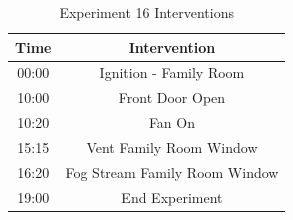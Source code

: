 \documentclass{article}
\begin{document}
\begin{table}[H]
	\centering
	\caption{Experiment 16 Interventions}
	\begin{tabular}{|c|c|} 
		\hline
		Time & Intervention \\ \hline \hline
		00:00 & Ignition - Family Room \\ \hline
		10:00 & Front Door Open \\ \hline
		10:20 & Fan On \\ \hline
		15:15 & Vent Family Room Window \\ \hline
		16:20 & Fog Stream Family Room Window \\ \hline
		19:00 & End Experiment \\ \hline
	\end{tabular}
	\label{Table:Exp16Interventions}
\end{table}
\end{document}
